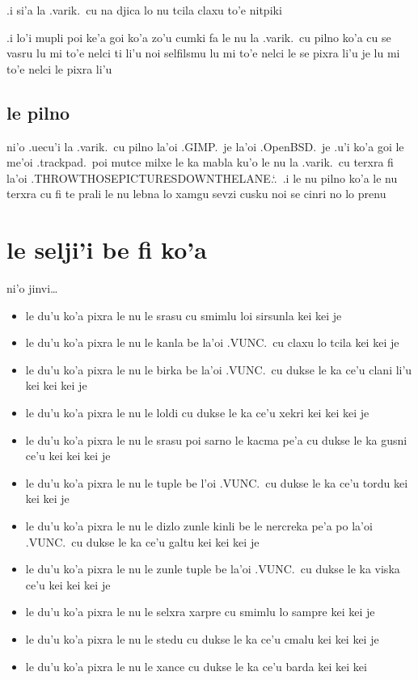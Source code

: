 \documentclass{report}
\newcommand\sds{\spacefactor\sfcode`.\ \space}
\begin{document}
.i si'a la .varik.\ cu na djica lo nu tcila claxu to'e nitpiki

.i lo'i mupli poi ke'a goi ko'a zo'u cumki fa le nu la .varik.\ cu pilno ko'a cu se vasru lu mi to'e nelci ti li'u noi selfilsmu lu mi to'e nelci le se pixra li'u je lu mi to'e nelci le pixra li'u

\subsection{le pilno}
ni'o .uecu'i la .varik.\ cu pilno la'oi .GIMP.\ je la'oi .OpenBSD.\ je .u'i ko'a goi le me'oi .trackpad.\ poi mutce milxe le ka mabla ku'o le nu la .varik.\ cu terxra fi la'oi .THROWTHOSEPICTURESDOWNTHELANE.\sds  .i le nu pilno ko'a le nu terxra cu fi te prali le nu lebna lo xamgu sevzi cusku noi se cinri no lo prenu

\section{le selji'i be fi ko'a}
ni'o jinvi\ldots
\begin{itemize}
	\item le du'u ko'a pixra le nu le srasu cu smimlu loi sirsunla kei kei je
	\item le du'u ko'a pixra le nu le kanla be la'oi .VUNC.\ cu claxu lo tcila kei kei je
	\item le du'u ko'a pixra le nu le birka be la'oi .VUNC.\ cu dukse le ka ce'u clani li'u kei kei kei je
	\item le du'u ko'a pixra le nu le loldi cu dukse le ka ce'u xekri kei kei kei je
	\item le du'u ko'a pixra le nu le srasu poi sarno le kacma pe'a cu dukse le ka gusni ce'u kei kei kei je
	\item le du'u ko'a pixra le nu le tuple be l'oi .VUNC.\ cu dukse le ka ce'u tordu kei kei kei je
	\item le du'u ko'a pixra le nu le dizlo zunle kinli be le nercreka pe'a po la'oi .VUNC.\ cu dukse le ka ce'u galtu kei kei kei je
	\item le du'u ko'a pixra le nu le zunle tuple be la'oi .VUNC.\ cu dukse le ka viska ce'u kei kei kei je
	\item le du'u ko'a pixra le nu le selxra xarpre cu smimlu lo sampre kei kei je
	\item le du'u ko'a pixra le nu le stedu cu dukse le ka ce'u cmalu kei kei kei je
	\item le du'u ko'a pixra le nu le xance cu dukse le ka ce'u barda kei kei kei
\end{itemize}
\end{document}
